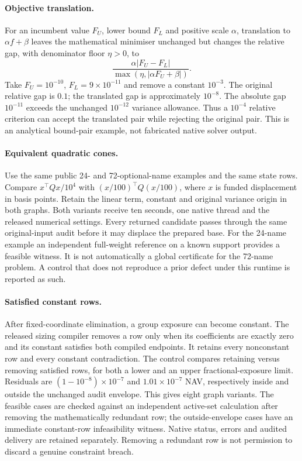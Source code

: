 \documentclass[11pt]{article}
\begin{document}
\paragraph{Objective translation.}
For an incumbent value $F_U$, lower bound $F_L$ and positive scale $\alpha$, translation
to $\alpha f+\beta$ leaves the mathematical minimiser unchanged but changes
the relative gap, with denominator floor $\eta>0$, to
\[
 \frac{\alpha|F_U-F_L|}{\max(\eta,|\alpha F_U+\beta|)}.
\]
Take $F_U=10^{-10}$, $F_L=9\times10^{-11}$ and remove a constant $10^{-3}$.
The original relative gap is $0.1$; the translated gap is approximately
$10^{-8}$. The absolute gap $10^{-11}$ exceeds the unchanged $10^{-12}$
variance allowance. Thus a $10^{-4}$ relative criterion can accept the
translated pair while rejecting the original pair. This is an analytical
bound-pair example, not fabricated native solver output.

\paragraph{Equivalent quadratic cones.}
Use the same public 24- and 72-optional-name examples and the same state rows.
Compare $x^\top Qx/10^4$ with $(x/100)^\top Q(x/100)$, where $x$ is funded
displacement in basis points. Retain the linear term, constant and original
variance origin in both graphs. Both variants receive ten seconds, one native
thread and the released numerical settings. Every returned candidate passes
through the same original-input audit before it may displace the prepared base.
For the 24-name example an independent full-weight reference on a known support
provides a feasible witness. It is not automatically a global certificate for
the 72-name problem. A control that does not reproduce a prior defect under
this runtime is reported as such.

\paragraph{Satisfied constant rows.}
After fixed-coordinate elimination, a group exposure can become constant.
The released sizing compiler removes a row only when its coefficients are
exactly zero and its constant satisfies both compiled endpoints. It retains
every nonconstant row and every constant contradiction. The control compares
retaining versus removing satisfied rows, for both a lower and an upper
fractional-exposure limit. Residuals are $(1-10^{-8})\times10^{-7}$ and
$1.01\times10^{-7}$ NAV, respectively inside and outside the unchanged audit
envelope. This gives eight graph variants. The feasible cases are checked
against an independent active-set calculation after removing the mathematically
redundant row; the outside-envelope cases have an immediate constant-row
infeasibility witness. Native status, errors and audited delivery are retained
separately. Removing a redundant row is not permission to discard a genuine
constraint breach.
\end{document}
